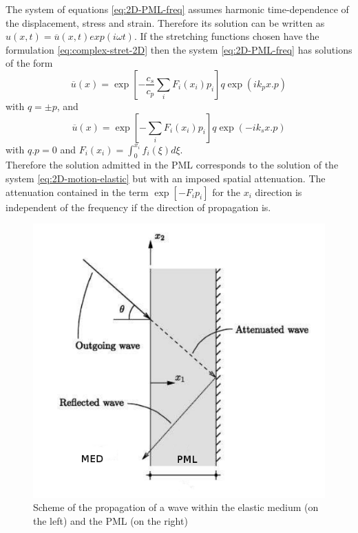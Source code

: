 The system of equations \ref{eq:2D-PML-freq} assumes harmonic time-dependence of the displacement, stress and strain. Therefore its solution can be written as $u(x,t) = \overline{u}(x,t)exp(i \omega t)$. If the stretching functions chosen have the formulation \ref{eq:complex-stret-2D} then the system \ref{eq:2D-PML-freq} has solutions of the form 
\begin{equation}
\overline{u}(x) = \exp[-\frac{c_s}{c_p}\sum_i F_i(x_i)p_i ] q  \exp(i k_p x . p)
\end{equation}
with $q = \pm p$, and
\begin{equation}
\overline{u}(x) = \exp [ -\sum_i F_i(x_i)p_i ] q  \exp(- i k_s x . p)
\end{equation}
with $q.p=0$ and $F_i(x_i) = \int_0^{x_i} f_i(\xi) d\xi$.\\
Therefore the solution admitted in the PML corresponds to the solution of the system \ref{eq:2D-motion-elastic} but with an imposed spatial attenuation. 
The attenuation contained in the term $\exp[ - F_i p_i ]$ for the $x_i$ direction is independent of the frequency if the direction of propagation is. 


\begin{figure}[H]
\centering
\includegraphics[scale=0.5]{images/scheme-layers.png}
\caption{Scheme of the propagation of a wave within the elastic medium (on the left) and the PML (on the right)}
\label{fig:scheme-layers}
\end{figure} 
